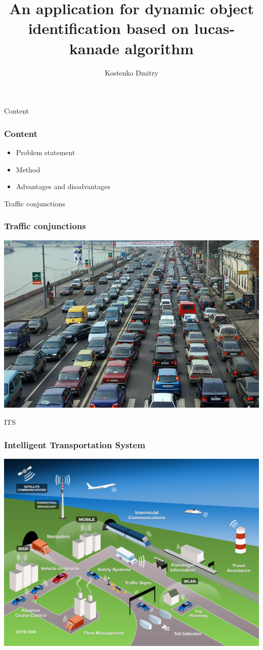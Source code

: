 \documentclass{beamer}
\begin{document}
\title{An application for dynamic object identification based on lucas-kanade algorithm}  
\author{Kostenko Dmitry}

\date{} 
\frame{\titlepage}



\begin{frame}{Content}
	\frametitle{Content}
	\begin{itemize}
  		\item Problem statement
  		\item Method 
  		\item Advantages and disadvantages
	\end{itemize}
\end{frame}


\begin{frame}{Traffic conjunctions}
	\frametitle{Traffic conjunctions}
	\begin{center}
		\includegraphics[width= 0.8\linewidth]{images/traffic_jam.jpg}  
	\end{center}
\end{frame}



\begin{frame}{ITS}
	\frametitle{Intelligent Transportation System}
	\begin{center}
		\includegraphics[width= 0.8\linewidth]{images/its.jpg}  
	\end{center}
\end{frame}
\end{document}
